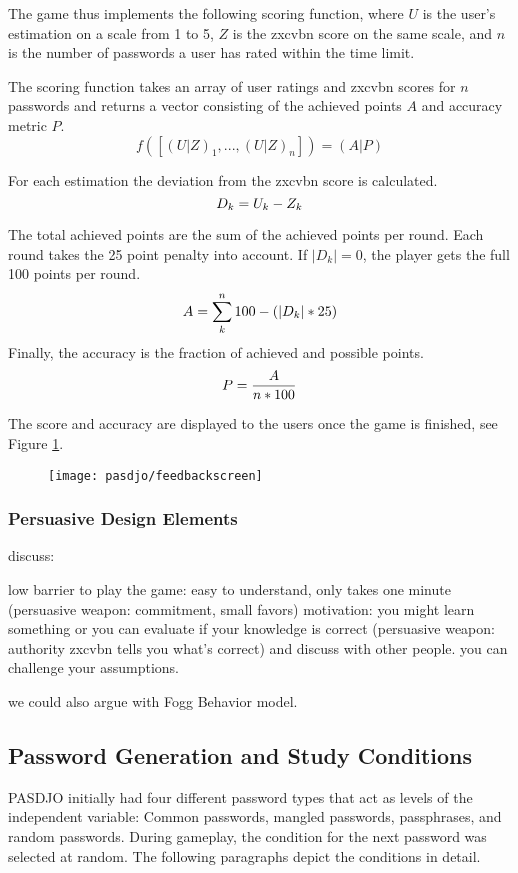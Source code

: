 The game thus implements the following scoring function, where $U$ is the user's estimation on a scale from 1 to 5, $Z$ is the zxcvbn score on the same scale, and $n$ is the number of passwords a user has rated within the time limit. 

\noindent The scoring function takes an array of user ratings and zxcvbn scores for $n$ passwords and returns a vector consisting of the achieved points $A$ and accuracy metric $P$.
\[
f([(U|Z)_1, ..., (U|Z)_n]) = (A|P)
\]

\noindent For each estimation the deviation from the zxcvbn score is calculated.
\[
D_k = U_k - Z_k\\
\]

\noindent The total achieved points are the sum of the achieved points per round. Each round takes the 25 point penalty into account. If $|D_k|=0$, the player gets the full 100 points per round.
\[
A = \sum_{k}^{n} 100 - (|D_k|*25) \\
\]
\noindent Finally, the accuracy is the fraction of achieved and possible points. 
\[
P = \frac{A}{n * 100}\\
\]

The score and accuracy are displayed to the users once the game is finished, see Figure \ref{fig:pasdjo:feedbackscreen}.

\begin{figure}
	\centering
	\texttt{[image: pasdjo/feedbackscreen]}
	\caption{\label{fig:pasdjo:feedbackscreen}}
\end{figure}

\subsubsection{Persuasive Design Elements}
discuss: 

low barrier to play the game: easy to understand, only takes one minute (persuasive weapon: commitment, small favors)
motivation: you might learn something or you can evaluate if your knowledge is correct (persuasive weapon: authority zxcvbn tells you what's correct) and discuss with other people. you can challenge your assumptions. 

we could also argue with Fogg Behavior model. 


\subsection{Password Generation and Study Conditions}
\makeatletter
PASDJO initially had four different password types that act as levels of the independent variable: Common passwords, mangled passwords, passphrases, and random passwords. During gameplay, the condition for the next password was selected at random. The following paragraphs depict the conditions in detail. 


